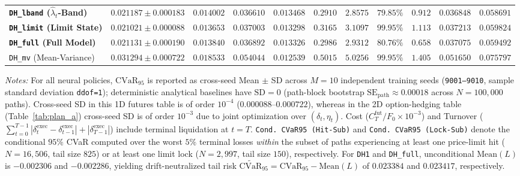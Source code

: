 \documentclass[11pt,a4paper]{article}
\begin{document}
\begin{table}[htbp]
{\begin{tabular}{lcccccccccc}
    \textbf{\texttt{DH\_lband} ($\hat{\lambda}_t$-Band)} & $\mathbf{0.021187 \pm 0.000183}$ & $0.014002$ & $\mathbf{0.036610}$ & $0.013468$ & $\mathbf{0.2910}$ & $\mathbf{2.8575}$ & $\mathbf{79.85\%}$ & $0.912$ & $\mathbf{0.036848}$ & $\mathbf{0.058691}$ \\
    \textbf{\texttt{DH\_limit} (Limit State)} & $\mathbf{0.021021 \pm 0.000088}$ & $\mathbf{0.013653}$ & $0.037003$ & $0.013298$ & $0.3165$ & $3.1097$ & $99.95\%$ & $1.113$ & $0.037213$ & $0.059824$ \\
    \textbf{\texttt{DH\_full} (Full Model)} & $0.021131 \pm 0.000190$ & $0.013840$ & $0.036892$ & $0.013326$ & $\mathbf{0.2986}$ & $\mathbf{2.9312}$ & $\mathbf{80.76\%}$ & $\mathbf{0.658}$ & $0.037075$ & $0.059492$ \\
    \texttt{DH\_mv} (Mean-Variance) & $0.031294 \pm 0.000722$ & $0.018533$ & $0.054044$ & $\mathbf{0.012539}$ & $0.5015$ & $5.0256$ & $99.95\%$ & $1.405$ & $0.051650$ & $0.075797$ \\
    \bottomrule
  \end{tabular}%
  }
  \vspace{3pt}\par\noindent
  \begin{minipage}{\textwidth}
    \footnotesize
    \textit{Notes:} For all neural policies, $\text{CVaR}_{95}$ is reported as cross-seed Mean $\pm$ SD across $M = 10$ independent training seeds (\texttt{9001--9010}, sample standard deviation \texttt{ddof=1}); deterministic analytical baselines have $\text{SD} = 0$ (path-block bootstrap $\text{SE}_{\text{path}} \approx 0.00018$ across $N = 100,000$ paths). Cross-seed SD in this 1D futures table is of order $10^{-4}$ ($0.000088\text{--}0.000722$), whereas in the 2D option-hedging table (Table~\ref{tab:plan_a}) cross-seed SD is of order $10^{-3}$ due to joint optimization over $(\delta_t, \eta_t)$. Cost ($C_T^{\text{fut}}/F_0 \times 10^{-3}$) and Turnover ($\sum_{t=0}^{T-1}|\delta_t^{\text{exec}} - \delta_{t-1}^{\text{exec}}| + |\delta_{T-1}^{\text{exec}}|$) include terminal liquidation at $t = T$. \texttt{Cond.\ CVaR95 (Hit-Sub)} and \texttt{Cond.\ CVaR95 (Lock-Sub)} denote the conditional $95\%$ CVaR computed over the worst $5\%$ terminal losses \emph{within} the subset of paths experiencing at least one price-limit hit ($N = 16,506$, tail size $825$) or at least one limit lock ($N = 2,997$, tail size $150$), respectively. For \texttt{DH1} and \texttt{DH\_full}, unconditional $\text{Mean}(L)$ is $-0.002306$ and $-0.002286$, yielding drift-neutralized tail risk $\widetilde{\text{CVaR}}_{95} = \text{CVaR}_{95} - \text{Mean}(L)$ of $0.023384$ and $0.023417$, respectively.
  \end{minipage}
\end{table}
\end{document}

